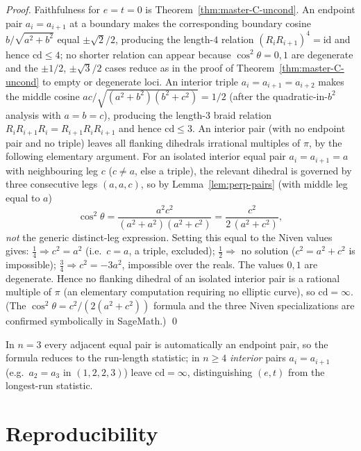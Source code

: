 \documentclass[11pt,a4paper]{article}
\theoremstyle{remark}
\theoremstyle{plain}
\begin{document}
\begin{proof}
Faithfulness for $e = t = 0$ is Theorem~\ref{thm:master-C-uncond}.  An
endpoint pair $a_i = a_{i+1}$ at a boundary makes the corresponding
boundary cosine $b/\sqrt{a^2+b^2}$ equal $\pm\sqrt 2/2$, producing the
length-$4$ relation $(R_i R_{i+1})^4 = \mathrm{id}$ and hence
$\mathrm{cd} \le 4$; no shorter relation can appear because
$\cos^2\theta = 0, 1$ are degenerate and the $\pm 1/2$, $\pm\sqrt 3/2$
cases reduce as in the proof of Theorem~\ref{thm:master-C-uncond} to
empty or degenerate loci.  An interior triple $a_i = a_{i+1} = a_{i+2}$
makes the middle cosine $ac/\sqrt{(a^2+b^2)(b^2+c^2)} = 1/2$ (after the
quadratic-in-$b^2$ analysis with $a = b = c$), producing the length-$3$
braid relation $R_i R_{i+1} R_i = R_{i+1} R_i R_{i+1}$ and hence
$\mathrm{cd} \le 3$.  An interior pair (with no endpoint pair and no
triple) leaves all flanking dihedrals irrational multiples of $\pi$, by
the following elementary argument.  For an isolated interior equal pair
$a_i = a_{i+1} = a$ with neighbouring leg $c$ ($c \ne a$, else a triple),
the relevant dihedral is governed by three consecutive legs $(a, a, c)$,
so by Lemma~\ref{lem:perp-pairs} (with middle leg equal to $a$)
\[
\cos^2\theta = \frac{a^2 c^2}{(a^2 + a^2)(a^2 + c^2)}
             = \frac{c^2}{2\,(a^2 + c^2)},
\]
\emph{not} the generic distinct-leg expression.  Setting this equal to
the Niven values gives: $\tfrac14 \Rightarrow c^2 = a^2$ (i.e.\ $c = a$, a
triple, excluded); $\tfrac12 \Rightarrow$ no solution
($c^2 = a^2 + c^2$ is impossible); $\tfrac34 \Rightarrow c^2 = -3a^2$,
impossible over the reals.  The values $0, 1$ are degenerate.  Hence no
flanking dihedral of an isolated interior pair is a rational multiple of
$\pi$ (an elementary computation requiring no elliptic curve), so
$\mathrm{cd} = \infty$.  (The $\cos^2\theta = c^2/(2(a^2+c^2))$ formula
and the three Niven specializations are confirmed symbolically in
SageMath.)
\qed
\end{proof}

In $n = 3$ every adjacent equal pair is automatically an
endpoint pair, so the formula reduces to the run-length statistic; in
$n \ge 4$ \emph{interior} pairs $a_i = a_{i+1}$ (e.g.\ $a_2 = a_3$ in
$(1, 2, 2, 3)$) leave $\mathrm{cd} = \infty$, distinguishing $(e, t)$
from the longest-run statistic.

\section{Reproducibility}
\label{sec:reproduce}
\end{document}
